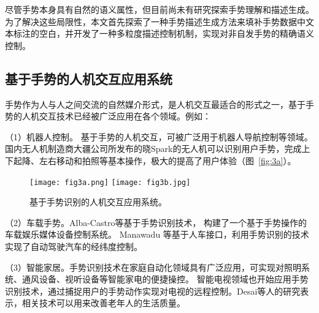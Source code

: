 尽管手势本身具有自然的语义属性，但目前尚未有研究探索手势理解和描述生成。
为了解决这些局限性，本文首先探索了一种手势描述生成方法来填补手势数据中文本标注的空白，并开发了一种多粒度描述控制机制，实现对非自发手势的精确语义控制。



\subsection{基于手势的人机交互应用系统}
手势作为人与人之间交流的自然媒介形式，是人机交互最适合的形式之一\cite{oudah2020hand}，基于手势的人机交互技术已经被广泛应用在各个领域。例如：

（1）机器人控制。 基于手势的人机交互，可被广泛用于机器人导航控制等领域\cite{al20223d}。国内无人机制造商大疆公司所发布的晓Spark的无人机可以识别用户手势，完成上下起降、左右移动和拍照等基本操作，极大的提高了用户体验（图~\ref{fig:3a}）。

\begin{figure}
  \centering
    {\texttt{[image: fig3a.png]}}
    {\texttt{[image: fig3b.jpg]}}
  \caption{基于手势识别的人机交互应用系统。}
  \label{fig:HCI_system}
\end{figure}

（2）车载手势。Alba-Castro等基于手势识别技术， 构建了一个基于手势操作的车载娱乐媒体设备控制系统\cite{parada2014hand}。 Manawadu 等基于人车接口，利用手势识别的技术实现了自动驾驶汽车的经纬度控制\cite{manawadu2016hand}。

（3）智能家居。手势识别技术在家庭自动化领域具有广泛应用，可实现对照明系统、通风设备、视听设备等智能家电的便捷操控。
智能电视领域也开始应用手势识别技术，通过捕捉用户的手势动作实现对电视的远程控制。Desai等人的研究表示，相关技术可以用来改善老年人的生活质量\cite{desai2017human}。

